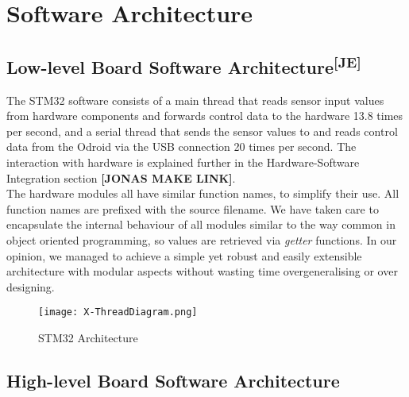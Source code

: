 \chapter{Software Architecture}
\section[Low-level Board Software Architecture]
{Low-level Board Software Architecture\textsuperscript{[JE]}}
The STM32 software consists of a main thread that reads sensor input values from
hardware components and forwards control data to the hardware 13.8 times per
second, and a serial thread that sends the sensor values to and reads control
data from the Odroid via the USB connection 20 times per second. The interaction
with hardware is explained further in the Hardware-Software Integration section
\textbf{[JONAS MAKE LINK]}.\\

\noindent
The hardware modules all have similar function names, to simplify their use. All
function names are prefixed with the source filename. We have taken care to
encapsulate the internal behaviour of all modules similar to the way common in
object oriented programming, so values are retrieved via \textit{getter}
functions. In our opinion, we managed to achieve a simple yet robust and easily
extensible architecture with modular aspects without wasting time
overgeneralising or over designing.
\newpage
\begin{figure}[ht]
  \centering
  \texttt{[image: X-ThreadDiagram.png]}
  \caption{STM32 Architecture}
  \label{xtdiagr}
\end{figure}

\newpage
\section{High-level Board Software Architecture}

